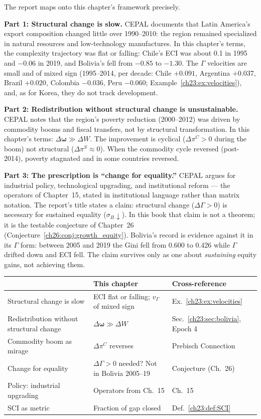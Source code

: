 \documentclass[../structural_economics_book.tex]{subfiles}
\begin{document}
The report maps onto this chapter's framework precisely.

\textbf{Part 1: Structural change is slow.} CEPAL documents that Latin America's export composition changed little over 1990--2010: the region remained specialized in natural resources and low-technology manufactures. In this chapter's terms, the complexity trajectory was flat or falling: Chile's ECI was about 0.1 in 1995 and $-0.06$ in 2019, and Bolivia's fell from $-0.85$ to $-1.30$. The $\Gamma$ velocities are small and of mixed sign (1995--2014, per decade: Chile $+0.091$, Argentina $+0.037$, Brazil $+0.020$, Colombia $-0.036$, Peru $-0.060$; Example~\ref{ch23:ex:velocities}), and, as for Korea, they do not track development.

\textbf{Part 2: Redistribution without structural change is unsustainable.} CEPAL notes that the region's poverty reduction (2000--2012) was driven by commodity booms and fiscal transfers, not by structural transformation. In this chapter's terms: $\Delta\boldsymbol{\omega} \gg \Delta W$. The improvement is cyclical ($\Delta\pi^C > 0$ during the boom) not structural ($\Delta\pi^S \approx 0$). When the commodity cycle reversed (post-2014), poverty stagnated and in some countries reversed.

\textbf{Part 3: The prescription is ``change for equality.''} CEPAL argues for industrial policy, technological upgrading, and institutional reform --- the operators of Chapter~15, stated in institutional language rather than matrix notation. The report's title states a claim: structural change ($\Delta\Gamma > 0$) is necessary for sustained equality ($\sigma_B \downarrow$). In this book that claim is not a theorem; it is the testable conjecture of Chapter~26 (Conjecture~\ref{ch26:conj:growth_equity}). Bolivia's record is evidence against it in its $\Gamma$ form: between 2005 and 2019 the Gini fell from 0.600 to 0.426 while $\Gamma$ drifted down and ECI fell. The claim survives only as one about \emph{sustaining} equity gains, not achieving them.

\begin{center}
\begin{tabularx}{\textwidth}{LLL}
\toprule
\textbf{\citet{cepal2012structural}} & \textbf{This chapter} & \textbf{Cross-reference} \\
\midrule
Structural change is slow & ECI flat or falling; $v_\Gamma$ of mixed sign & Ex.~\ref{ch23:ex:velocities} \\
Redistribution without structural change & $\Delta\boldsymbol{\omega} \gg \Delta W$ & Sec.~\ref{ch23:sec:bolivia}, Epoch 4 \\
Commodity boom as mirage & $\Delta\pi^C$ reverses & Prebisch Connection \\
Change for equality & $\Delta\Gamma > 0$ needed? Not in Bolivia 2005--19 & Conjecture (Ch.~26) \\
Policy: industrial upgrading & Operators from Ch.~15 & Ch.~15 \\
SCI as metric & Fraction of gap closed & Def.~\ref{ch23:def:SCI} \\
\bottomrule
\end{tabularx}
\end{center}
\end{document}
